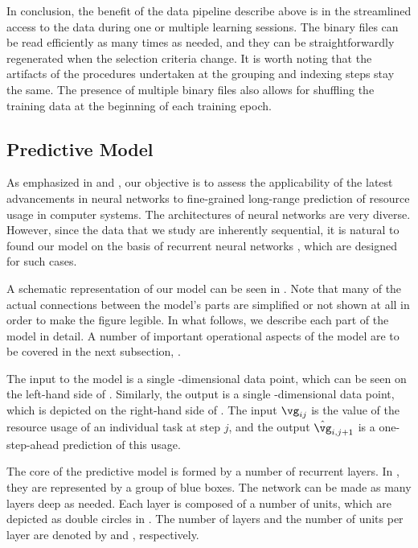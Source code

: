 In conclusion, the benefit of the data pipeline describe above is in the
streamlined access to the data during one or multiple learning sessions. The
binary files can be read efficiently as many times as needed, and they can be
straightforwardly regenerated when the selection criteria change. It is worth
noting that the artifacts of the procedures undertaken at the grouping and
indexing steps stay the same. The presence of multiple binary files also allows
for shuffling the training data at the beginning of each training epoch.

\subsection{Predictive Model}

As emphasized in  and , our
objective is to assess the applicability of the latest advancements in neural
networks \cite{goodfellow2016} to fine-grained long-range prediction of resource
usage in computer systems. The architectures of neural networks are very
diverse. However, since the data that we study are inherently sequential, it is
natural to found our model on the basis of recurrent neural networks
\cite{goodfellow2016}, which are designed for such cases.

A schematic representation of our model can be seen in
. Note that many of the actual connections between
the model's parts are simplified or not shown at all in order to make the figure
legible. In what follows, we describe each part of the model in detail. A number
of important operational aspects of the model are to be covered in the next
subsection, .

The input to the model is a single \ng-dimensional data point, which can be seen
on the left-hand side of . Similarly, the output is
a single \ng-dimensional data point, which is depicted on the right-hand side of
. The input $\vg_{ij}$ is the value of the resource
usage of an individual task at step $j$, and the output $\hat{\vg}_{i, j + 1}$
is a one-step-ahead prediction of this usage.

The core of the predictive model is formed by a number of recurrent layers. In
, they are represented by a group of blue boxes.
The network can be made as many layers deep as needed. Each layer is composed of
a number of units, which are depicted as double circles in
. The number of layers and the number of units per
layer are denoted by \nl and \nu, respectively.


